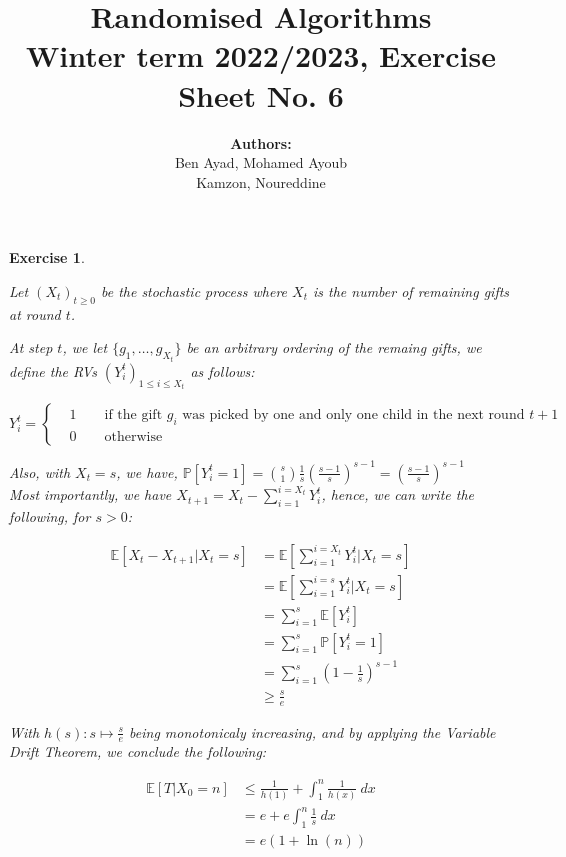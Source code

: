 \documentclass{article}
\title{Randomised Algorithms \\
Winter term 2022/2023, Exercise Sheet No. 6}
\author{
    \textbf{Authors:} \\
    Ben Ayad, Mohamed Ayoub \\
    Kamzon, Noureddine
}
\newtheorem{exo}{Exercise}
\def\P{\mathbb{P}}
\def\E{\mathbb{E}}
\begin{document}
\maketitle

\begin{exo}{\ \\}

Let $(X_t)_{t\geq0}$ be the stochastic process where $X_t$ is the number of remaining gifts at round $t$.

\noindent
At step $t$, we let $\{g_1, \dots, g_{X_t}\}$ be an arbitrary ordering of the remaing gifts, we define the RVs $(Y_i^{t})_{1\leq i\leq X_t}$ as follows: 

\[   
Y_i^{t} = 
\begin{cases}
    &1 \quad \quad \text{if the gift $g_i$ was picked by one and only one child in the next round $t+1$} \\
    &0 \quad \quad \text{otherwise}
\end{cases}
\]

Also, with $X_t = s$, we have, $\P[Y_i^t = 1] = \binom{s}{1} \frac{1}{s} (\frac{s-1}{s})^{s-1} = (\frac{s-1}{s})^{s-1}$   \\

Most importantly, we have $X_{t+1} = X_t - \sum_{i=1}^{i=X_t} Y_i^{t} $, hence, we can write the following, for $s>0$:

\begin{align*}
    \E[X_t-X_{t+1}| X_t=s] 
    &= \E[\sum_{i=1}^{i=X_t} Y_i^t| X_t = s] \\
    &= \E[\sum_{i=1}^{i=s} Y_i^t| X_t = s] \\
    &= \sum_{i=1}^{s} \E[Y_i^t] \\
    &= \sum_{i=1}^{s} \P[Y_i^t = 1] \\
    &= \sum_{i=1}^{s} (1 - \frac{1}{s})^{s-1} \\
    &\geq \frac{s}{e} 
\end{align*}

With $h(s): s \mapsto \frac{s}{e}$ being monotonicaly increasing, and by applying the Variable Drift Theorem, we conclude the following:

\begin{align*}
    \E[T|X_0=n]
    &\leq \frac{1}{h(1)} + \int_{{1}}^{{n}} {\frac{1}{h(x)} } \: d{x} \\
    &= e + e \int_{{1}}^{{n}} {\frac{1}{s} } \: d{x} \\
    &= e(1 + \ln(n)) \\ 
\end{align*}
\end{exo}
\end{document}
